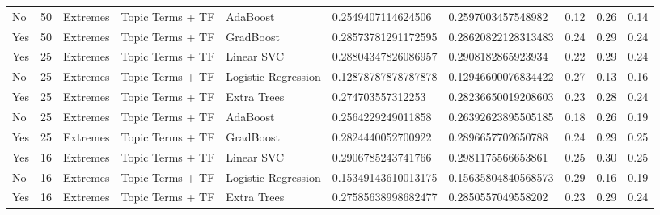 \begin{table}[]
\begin{tabular}{@{}llllllllll@{}}
    No                  & 50              & Extremes              & Topic Terms + TF      & AdaBoost            & 0.2549407114624506      & 0.2597003457548982     & 0.12               & 0.26            & 0.14              \\
    Yes                 & 50              & Extremes              & Topic Terms + TF      & GradBoost           & 0.28573781291172595     & 0.28620822128313483    & 0.24               & 0.29            & 0.24              \\
    Yes                 & 25              & Extremes              & Topic Terms + TF      & Linear SVC          & 0.28804347826086957     & 0.2908182865923934     & 0.22               & 0.29            & 0.24              \\
    No                  & 25              & Extremes              & Topic Terms + TF      & Logistic Regression & 0.12878787878787878     & 0.12946600076834422    & 0.27               & 0.13            & 0.16              \\
    Yes                 & 25              & Extremes              & Topic Terms + TF      & Extra Trees         & 0.274703557312253       & 0.28236650019208603    & 0.23               & 0.28            & 0.24              \\
    No                  & 25              & Extremes              & Topic Terms + TF      & AdaBoost            & 0.2564229249011858      & 0.26392623895505185    & 0.18               & 0.26            & 0.19              \\
    Yes                 & 25              & Extremes              & Topic Terms + TF      & GradBoost           & 0.2824440052700922      & 0.2896657702650788     & 0.24               & 0.29            & 0.25              \\
    Yes                 & 16              & Extremes              & Topic Terms + TF      & Linear SVC          & 0.2906785243741766      & 0.2981175566653861     & 0.25               & 0.30            & 0.25              \\
    No                  & 16              & Extremes              & Topic Terms + TF      & Logistic Regression & 0.15349143610013175     & 0.15635804840568573    & 0.29               & 0.16            & 0.19              \\
    Yes                 & 16              & Extremes              & Topic Terms + TF      & Extra Trees         & 0.27585638998682477     & 0.2850557049558202     & 0.23               & 0.29            & 0.24              \\

\end{tabular}
\end{table}
